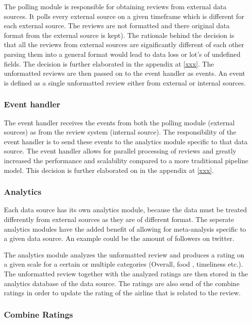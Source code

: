 The polling module is responsible for obtaining reviews from external data sources. It polls every external source on a given timeframe which is different for each external source. The reviews are not formatted and there original data format from the external source is kept). The rationale behind the decision is that all the reviews from external sources are significantly different of each other parsing them into a general format would lead to data loss or lot's of undefined fields. The decision is further elaborated in the appendix at \ref{xxx}. The unformatted reviews are then passed on to the event handler as events. An event is defined as a single unformatted review either from external or internal sources. 

\subsubsection{Event handler}

The event handler receives the events from both the polling module (external sources) as from the review system (internal source). The responsibility of the event handler is to send these events to the analytics module specific to that data source. The event handler allows for parallel processing of reviews and greatly increased the performance and scalability compared to a more traditional pipeline model. This decision is further elaborated on in the appendix at \ref{xxx}. 

\subsubsection{Analytics}

Each data source has its own analytics module, because the data must be treated differently from external sources as they are of different format. The seperate analytics modules have the added benefit of allowing for meta-analysis specific to a given data source. An example could be the amount of followers on twitter.  

The analytics module analyzes the unformatted review and produces a rating on a given scale for a certain or multiple categories (Overall, food , timeliness etc.). The unformatted review together with the analyzed ratings are then stored in the analytics database of the data source. The ratings are also send of the combine ratings in order to update the rating of the airline that is related to the review.

\subsubsection{Combine Ratings}

